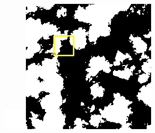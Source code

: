 \documentclass[10pt]{ctexart}
\begin{document}
\begin{multicols}{2}
\begin{figure}[H]
{\begin{minipage}[b]{0.15\linewidth}
            \includegraphics[width=1\linewidth]{../log/spoon2/cut/tmp_cut_LC81321192014054LGN00_03055_mask.jpg}\vspace{4pt}
            \includegraphics[width=1\linewidth]{../log/spoon2/cut/LC80350192014190LGN00_06561_mask.jpg}\vspace{4pt}

\end{minipage}}
\end{figure}
\end{multicols}
\end{document}
